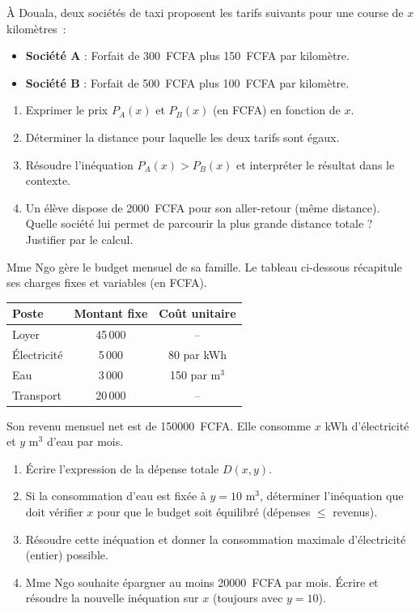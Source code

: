 \documentclass[11pt]{article}
\begin{document}
\begin{exercice}
À Douala, deux sociétés de taxi proposent les tarifs suivants pour une course de $x$ kilomètres~:
\begin{itemize}
    \item \textbf{Société A} : Forfait de \SI{300}{FCFA} plus \SI{150}{FCFA} par kilomètre.
    \item \textbf{Société B} : Forfait de \SI{500}{FCFA} plus \SI{100}{FCFA} par kilomètre.
\end{itemize}
\begin{enumerate}
    \item Exprimer le prix $P_A(x)$ et $P_B(x)$ (en FCFA) en fonction de $x$.
    \item Déterminer la distance pour laquelle les deux tarifs sont égaux.
    \item Résoudre l'inéquation $P_A(x) > P_B(x)$ et interpréter le résultat dans le contexte.
    \item Un élève dispose de \SI{2000}{FCFA} pour son aller-retour (même distance). Quelle société lui permet de parcourir la plus grande distance totale ? Justifier par le calcul.
\end{enumerate}
\end{exercice}

\begin{exercice}
Mme Ngo gère le budget mensuel de sa famille. Le tableau ci-dessous récapitule ses charges fixes et variables (en FCFA).

\begin{tabular}{|l|c|c|}
\hline
\textbf{Poste} & \textbf{Montant fixe} & \textbf{Coût unitaire} \\
\hline
Loyer & 45\,000 & -- \\
\hline
Électricité & 5\,000 & 80 par kWh \\
\hline
Eau & 3\,000 & 150 par m$^3$ \\
\hline
Transport & 20\,000 & -- \\
\hline
\end{tabular}

Son revenu mensuel net est de \SI{150000}{FCFA}. Elle consomme $x$ kWh d'électricité et $y$ m$^3$ d'eau par mois.
\begin{enumerate}
    \item Écrire l'expression de la dépense totale $D(x, y)$.
    \item Si la consommation d'eau est fixée à $y = 10$ m$^3$, déterminer l'inéquation que doit vérifier $x$ pour que le budget soit équilibré (dépenses $\leqslant$ revenus).
    \item Résoudre cette inéquation et donner la consommation maximale d'électricité (entier) possible.
    \item Mme Ngo souhaite épargner au moins \SI{20000}{FCFA} par mois. Écrire et résoudre la nouvelle inéquation sur $x$ (toujours avec $y=10$).
\end{enumerate}
\end{exercice}
\end{document}
